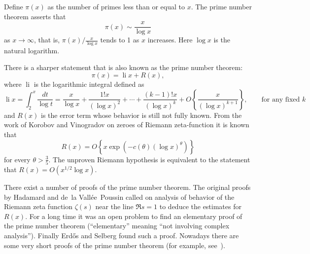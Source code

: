 \documentclass[12pt]{article}
\DeclareMathOperator{\li}{li}
\begin{document}

Define $\pi (x)$ as the number of primes less than or equal to $x$. The prime number theorem asserts that \[ \pi (x) \sim \frac{x}{\log x} \] as $x \rightarrow \infty$, that is, $\pi(x) / \frac{x}{\log x}$ tends to 1 as $x$ increases. Here ${\log x}$ is the natural logarithm.

There is a sharper statement that is also known as the prime number
theorem:
\begin{equation*}
\pi(x)=\li x+R(x),
\end{equation*}
where $\li$ is the logarithmic integral defined as
\begin{equation*}
\li x=\int_2^x \frac{dt}{\log t}=\frac{x}{\log x}+\frac{1!x}{(\log
x)^2}+\dotsb+\frac{(k-1)!x}{(\log x)^{k}}+O\left\{\frac{x}{(\log
x)^{k+1}}\right\},\qquad\text{for any fixed $k$}
\end{equation*}
and $R(x)$ is the error term whose behavior is still not fully
known. From the work of Korobov and Vinogradov on zeroes of
Riemann zeta-function it is known that
\begin{equation*}
R(x)=O\left\{x \exp(-c(\theta)(\log x)^\theta)\right\}
\end{equation*}
for every $\theta>\tfrac{3}{5}$. The unproven Riemann hypothesis
is equivalent to the statement that $R(x)=O(x^{1/2}\log x)$.

There exist a number of proofs of the prime number theorem. The
original proofs by Hadamard \cite{cite:hadamard_pnt} and de~la
Vall\'ee~Poussin\cite{cite:poussin_pnt} called on analysis of
behavior of the Riemann zeta function $\zeta(s)$ near the line $\Re s=1$
to deduce the estimates for $R(x)$. For a long time it was an open
problem to find an elementary proof of the prime number theorem
(``elementary'' meaning ``not involving complex analysis'').
Finally Erd\H{o}s and Selberg
\cite{cite:erdos_elempnt,cite:selberg_elempnt} found such a proof.
Nowadays there are some very short proofs of the prime number
theorem (for example, see~\cite{cite:newman_shortpnt}).
\end{document}
